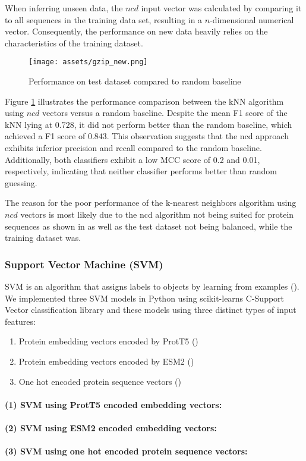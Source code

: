 \documentclass{bioinfo}
\begin{document}
When inferring unseen data, the $ncd$ input vector was calculated by comparing it to all sequences in 
the training data set, resulting in a $n$-dimensional numerical vector.
Consequently, the performance on new data heavily relies on the characteristics of the training dataset.

\begin{figure}[!thbp]
\texttt{[image: assets/gzip\_new.png]}
\caption{Performance on test dataset compared to random baseline}\label{fig:gzip_scores}
\end{figure}

Figure \ref{fig:gzip_scores} illustrates the performance comparison between the kNN algorithm using $ncd$ vectors versus a random baseline. 
Despite the mean F1 score of the kNN lying at $0.728$, it did not perform better than the random baseline, which 
achieved a F1 score of $0.843$.
This observation suggests that the ncd approach exhibits inferior precision and recall compared to the random baseline. 
Additionally, both classifiers exhibit a low MCC score of 0.2 and 0.01, respectively, indicating that neither classifier performs better than random guessing.

The reason for the poor performance of the k-nearest neighbors algorithm using $ncd$ vectors is
most likely due to the ncd algorithm not being suited for protein sequences as shown in \cite{GzipProteinCompression} as well as
the test dataset not being balanced, while the training dataset was.

\subsubsection{Support Vector Machine (SVM)}
SVM is an algorithm that assigns labels to objects by learning from examples (\cite{svm}).
We implemented three SVM models in Python using scikit-learns C-Support Vector classification library and these models using three distinct types of 
input features: 
\begin{enumerate}
	\item[(1)] Protein embedding vectors encoded by ProtT5 (\cite{ProtT5})
	\item[(2)] Protein embedding vectors encoded by ESM2 (\cite{ESM2})
	\item[(3)] One hot encoded protein sequence vectors (\cite{oh_encoding})
\end{enumerate}

\paragraph{(1) SVM using ProtT5 encoded embedding vectors:}

\paragraph{(2) SVM using ESM2 encoded embedding vectors:}

\paragraph{(3) SVM using one hot encoded protein sequence vectors:}

 

\end{document}
